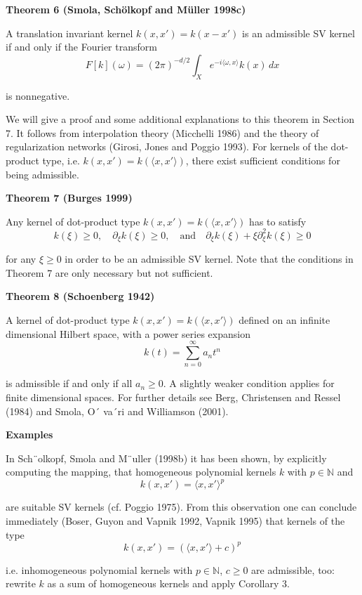 \documentclass[fleqn,10pt]{olplainarticle}
\begin{document}
\textbf{Theorem 6 (Smola, Sch\"olkopf and M\"uller 1998c)}

A translation invariant kernel \(k(x, x') = k(x - x')\) is an admissible SV kernel if and only if the Fourier transform
\[
F[k](\omega) = (2\pi)^{-d/2} \int_X e^{-i \langle \omega, x \rangle} k(x) \, dx
\]

is nonnegative.

We will give a proof and some additional explanations to this theorem in Section 7. It follows from interpolation theory (Micchelli 1986) and the theory of regularization networks (Girosi, Jones and Poggio 1993). For kernels of the dot-product type, i.e. \(k(x, x') = k(\langle x, x' \rangle)\), there exist sufficient conditions for being admissible.

\textbf{Theorem 7 (Burges 1999)}

Any kernel of dot-product type \(k(x, x') = k(\langle x, x' \rangle)\) has to satisfy
\[
k(\xi) \geq 0, \quad \partial_\xi k(\xi) \geq 0, \quad \text{and} \quad \partial_\xi k(\xi) + \xi \partial^2_\xi k(\xi) \geq 0
\]

for any \(\xi \geq 0\) in order to be an admissible SV kernel. Note that the conditions in Theorem 7 are only necessary but not sufficient.

\textbf{Theorem 8 (Schoenberg 1942)}

A kernel of dot-product type \(k(x, x') = k(\langle x, x' \rangle)\) defined on an infinite dimensional Hilbert space, with a power series expansion
\[
k(t) = \sum_{n=0}^\infty a_n t^n
\]

is admissible if and only if all \(a_n \geq 0\). A slightly weaker condition applies for finite dimensional spaces. For further details see Berg, Christensen and Ressel (1984) and Smola, O´ va´ri and Williamson (2001).

\textbf{Examples}

In Sch¨olkopf, Smola and M¨uller (1998b) it has been shown, by explicitly computing the mapping, that homogeneous polynomial kernels \(k\) with \(p \in \mathbb{N}\) and
\[
k(x, x') = \langle x, x' \rangle^p
\]

are suitable SV kernels (cf. Poggio 1975). From this observation one can conclude immediately (Boser, Guyon and Vapnik 1992, Vapnik 1995) that kernels of the type
\[
k(x, x') = (\langle x, x' \rangle + c)^p
\]

i.e. inhomogeneous polynomial kernels with \(p \in \mathbb{N}\), \(c \geq 0\) are admissible, too: rewrite \(k\) as a sum of homogeneous kernels and apply Corollary 3.
\end{document}
